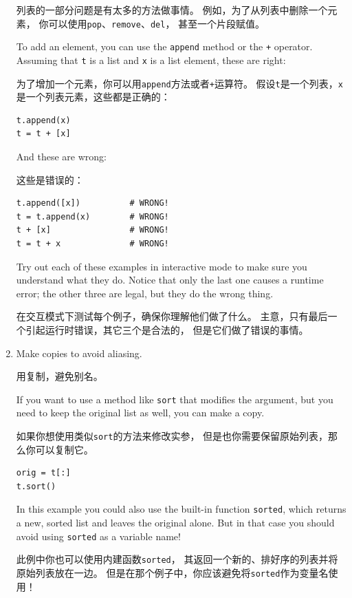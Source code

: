 \documentclass[10pt]{book}
\begin{document}
\begin{CJK}{UTF8}{gbsn}
\begin{enumerate}
列表的一部分问题是有太多的方法做事情。
例如，为了从列表中删除一个元素，
你可以使用{\tt pop}、{\tt remove}、{\tt del}，
甚至一个片段赋值。

To add an element, you can use the {\tt append} method or
the {\tt +} operator.  Assuming that {\tt t} is a list and
{\tt x} is a list element, these are right: 

为了增加一个元素，你可以用{\tt append}方法或者{\tt +}运算符。
假设{\tt t}是一个列表，{\tt x}是一个列表元素，这些都是正确的：

\begin{verbatim}
t.append(x)
t = t + [x]
\end{verbatim}

And these are wrong:

这些是错误的：

\begin{verbatim}
t.append([x])          # WRONG!
t = t.append(x)        # WRONG!
t + [x]                # WRONG!
t = t + x              # WRONG!
\end{verbatim}

Try out each of these examples in interactive mode to make sure
you understand what they do.  Notice that only the last
one causes a runtime error; the other three are legal, but they
do the wrong thing.

在交互模式下测试每个例子，确保你理解他们做了什么。
主意，只有最后一个引起运行时错误，其它三个是合法的，
但是它们做了错误的事情。


\item Make copies to avoid aliasing.

用复制，避免别名。

If you want to use a method like {\tt sort} that modifies
the argument, but you need to keep the original list as
well, you can make a copy.

如果你想使用类似{\tt sort}的方法来修改实参，
但是也你需要保留原始列表，那么你可以复制它。

\begin{verbatim}
orig = t[:]
t.sort()
\end{verbatim}

In this example you could also use the built-in function {\tt sorted},
which returns a new, sorted list and leaves the original alone.
But in that case you should avoid using {\tt sorted} as a variable
name!

此例中你也可以使用内建函数{\tt sorted}，
其返回一个新的、排好序的列表并将原始列表放在一边。
但是在那个例子中，你应该避免将{\tt sorted}作为变量名使用！


\end{enumerate}
\end{CJK}
\end{document}
